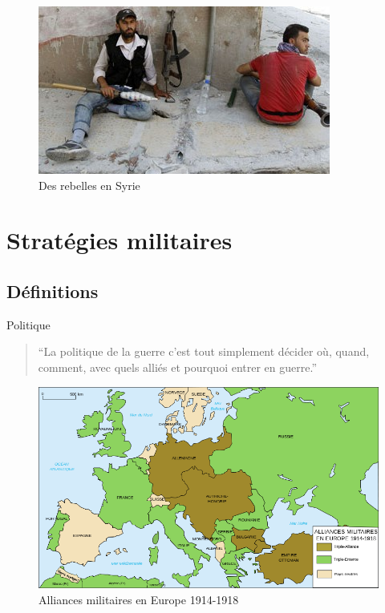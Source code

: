 \documentclass{article}
\begin{document}
\begin{figure}[H]
	\begin{centering}
	\includegraphics[]{../ressources/rebel_syrie}
	\caption{Des rebelles en Syrie \cite{rebel_syrie}}
	\end{centering}
\end{figure}


\section{Stratégies militaires}

\subsection{Définitions}
Politique \cite{politique_jomini}
\begin{quote}“La politique de la guerre c’est tout simplement décider où, quand, comment, avec quels alliés et pourquoi entrer en guerre.”\end{quote}
\begin{figure}[H]
	\begin{centering}
	\includegraphics[width=\linewidth]{../ressources/alliances_ww1}
	\caption{Alliances militaires en Europe 1914-1918 \cite{ww1}}
	\end{centering}
\end{figure}
\end{document}
